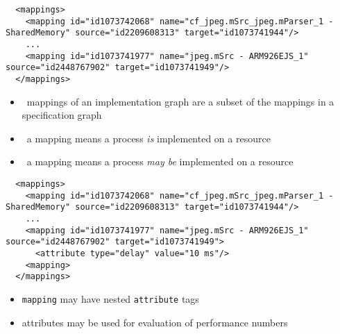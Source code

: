 \begin{frame}[fragile=singleslide]
\begin{lstlisting}
  <mappings>
    <mapping id="id1073742068" name="cf_jpeg.mSrc_jpeg.mParser_1 - SharedMemory" source="id2209608313" target="id1073741944"/>
    ...
    <mapping id="id1073741977" name="jpeg.mSrc - ARM926EJS_1" source="id2448767902" target="id1073741949"/>
  </mappings>
\end{lstlisting}
\begin{itemize}
\item \IGX\ mappings of an implementation graph are a subset of the mappings in a specification graph
\item \IGX\ a mapping means a process \emph{is} implemented on a resource
\item \SGX\ a mapping means a process \emph{may be} implemented on a resource
\end{itemize}
\end{frame}


\begin{frame}[fragile=singleslide]
\begin{lstlisting}
  <mappings>
    <mapping id="id1073742068" name="cf_jpeg.mSrc_jpeg.mParser_1 - SharedMemory" source="id2209608313" target="id1073741944"/>
    ...
    <mapping id="id1073741977" name="jpeg.mSrc - ARM926EJS_1" source="id2448767902" target="id1073741949">
      <attribute type="delay" value="10 ms"/>
    <mapping>
  </mappings>
\end{lstlisting}
\begin{itemize}
\item \lstinline|mapping| may have nested \lstinline|attribute| tags
\item attributes may be used for evaluation of performance numbers
\end{itemize}
\end{frame}


